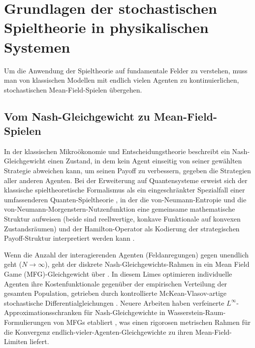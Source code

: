 \documentclass[12pt,a4paper]{article}
\theoremstyle{remark}
\begin{document}
\section{Grundlagen der stochastischen Spieltheorie in physikalischen Systemen}
\label{sec:foundations}

Um die Anwendung der Spieltheorie auf fundamentale Felder zu verstehen, muss man von klassischen Modellen mit endlich vielen Agenten zu kontinuierlichen, stochastischen Mean-Field-Spielen \"ubergehen.

\subsection{Vom Nash-Gleichgewicht zu Mean-Field-Spielen}

In der klassischen Mikro\"okonomie und Entscheidungstheorie beschreibt ein Nash-Gleichgewicht \citep{Nash1950} einen Zustand, in dem kein Agent einseitig von seiner gew\"ahlten Strategie abweichen kann, um seinen Payoff zu verbessern, gegeben die Strategien aller anderen Agenten. Bei der Erweiterung auf Quantensysteme erweist sich der klassische spieltheoretische Formalismus als ein eingeschr\"ankter Spezialfall einer umfassenderen Quanten-Spieltheorie \citep{QuantumOptimization}, in der die von-Neumann-Entropie und die von-Neumann-Morgenstern-Nutzenfunktion eine gemeinsame mathematische Struktur aufweisen (beide sind reellwertige, konkave Funktionale auf konvexen Zustandsr\"aumen) und der Hamilton-Operator als Kodierung der strategischen Payoff-Struktur interpretiert werden kann \citep{Abel2023,QuantumOptimization}.

Wenn die Anzahl der interagierenden Agenten (Feldanregungen) gegen unendlich geht ($N \to \infty$), geht der diskrete Nash-Gleichgewichts-Rahmen in ein Mean Field Game (MFG)-Gleichgewicht \"uber \citep{LasryLions2007}. In diesem Limes optimieren individuelle Agenten ihre Kostenfunktionale gegen\"uber der empirischen Verteilung der gesamten Population, getrieben durch kontrollierte McKean-Vlasov-artige stochastische Differentialgleichungen \citep{LasryLions2006}. Neuere Arbeiten haben verfeinerte $L^\infty$-Approximationsschranken f\"ur Nash-Gleichgewichte in Wasserstein-Raum-Formulierungen von MFGs etabliert \cite{DjeteTouzi2026}, was einen rigorosen metrischen Rahmen f\"ur die Konvergenz endlich-vieler-Agenten-Gleichgewichte zu ihren Mean-Field-Limiten liefert.
\end{document}
